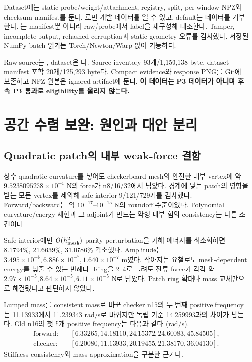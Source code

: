 \documentclass[10pt]{article}
\begin{document}
Dataset에는 static probe/weight/attachment, registry, split, per-window NPZ와 checksum manifest를 둔다.
로만 개발 데이터를 열 수 있고,
default는  데이터를 거부한다.
는 manifest뿐 아니라 raw/probe에서 label을 재구성해 대조한다.
Tamper, incomplete output, rehashed corruption과 static geometry 오류를 검사했다.
저장된 NumPy batch 읽기는 Torch/Newton/Warp 없이 가능하다.

Raw source는 ,
dataset은 다.
Source inventory 93개/1,150,138 byte, dataset manifest 포함 20개/125,293 byte다.
Compact evidence와 response PNG를 Git에 보존하고 NPZ 원본은 ignored artifact에 둔다.
\textbf{이 데이터는 P3 데이터가 아니며 후속 P3 통과로 eligibility를 올리지 않는다.}

\section{공간 수렴 보완: 원인과 대안 분리}

\subsection{Quadratic patch의 내부 weak-force 결함}

상수 quadratic curvature를 넣어도 checkerboard mesh의 안전한 내부 vertex에 약
\(9.5238095238\times10^{-4}\) N의 force가 n8/16/32에서 남았다.
경계에 닿는 patch의 영향을 받는 모든 vertex를 제외해 safe interior 9/121/729개를 검사했다.
Forward/backward는 약 \(10^{-17}\)--\(10^{-15}\) N의 roundoff 수준이었다.
Polynomial curvature/energy 재현과 그 adjoint가 만드는 약형 내부 힘의 consistency는 다른 조건이다.

Safe interior에만 \(O(h_{\rm mesh}^2)\) parity perturbation을 가해 에너지를 최소화하면
8.1794\%, 21.6639\%, 31.0786\% 감소했다. Amplitude는
\(3.495\times10^{-6},6.886\times10^{-7},1.640\times10^{-7}\) m였다.
작아지는 요철로도 mesh-dependent energy를 낮출 수 있는 반례다.
Ring을 2--4로 늘려도 잔류 force가 각각 약
\(2.97\times10^{-5},8.64\times10^{-5},6.11\times10^{-5}\) N로 남았다.
Patch ring 확대나 mass 교체만으로 해결됐다고 판단하지 않았다.

Lumped mass를 consistent mass로 바꾼 checker n16의 두 번째 positive frequency는
11.13933에서 11.239343 rad/s로 바뀌지만 독립 기준 14.259993과의 차이가 남는다.
Old n16의 첫 5개 positive frequency는 다음과 같다 (rad/s).
\[
\begin{aligned}
\text{forward}:&\quad[6.33265,14.18110,24.15372,24.60083,45.84505],\\
\text{checker}:&\quad[6.20080,11.13933,20.19455,21.38170,36.04130].
\end{aligned}
\]
Stiffness consistency와 mass approximation을 구분한 근거다.
\end{document}
